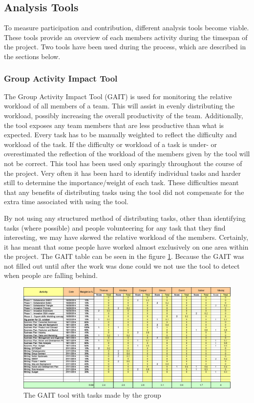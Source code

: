 \subsection{Analysis Tools}
To measure participation and contribution, different analysis tools become viable. These tools provide an overview of each members activity during the timespan of the project. Two tools have been used during the process, which are described in the sections below.

\subsubsection{Group Activity Impact Tool}
 The Group Activity Impact Tool (GAIT) is used for monitoring the relative workload of all members of a team. This will assist in evenly distributing the workload, possibly increasing the overall productivity of the team. Additionally, the tool exposes any team members that are less productive than what is expected. Every task has to be manually weighted to reflect the difficulty and workload of the task. If the difficulty or workload of a task is under- or overestimated the reflection of the workload of the members given by the tool will not be correct.
This tool has been used only sparingly throughout the course of the project. Very often it has been hard to identify individual tasks and harder still to determine the importance/weight of each task. These difficulties meant that any benefits of distributing tasks using the tool did not compensate for the extra time associated with using the tool. 

By not using any structured method of distributing tasks, other than identifying tasks (where possible) and people volunteering for any task that they find interesting, we may have skewed the relative workload of the members. Certainly, it has meant that some people have worked almost exclusively on one area within the project. The GAIT table can be seen in the figure \ref{fig:GAIT}. Because the GAIT was not filled out until after the work was done could we not use the tool to detect when people are falling behind.

\begin{figure}[ht]
	\includegraphics[width=\textwidth]{./graphics/gait}
	\caption{The GAIT tool with tasks made by the group}
	\label{fig:GAIT}
\end{figure}


